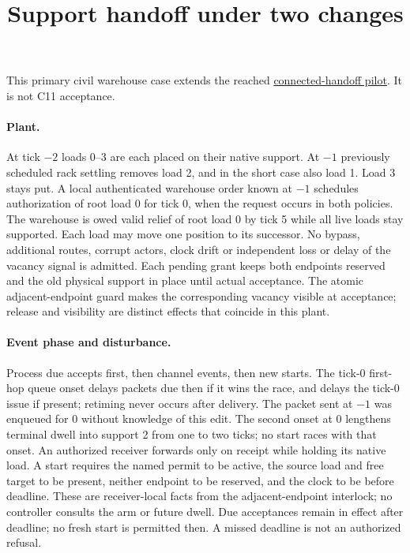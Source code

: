 \documentclass{article}
\title{Support handoff under two changes}
\date{}
\begin{document}
\maketitle
This primary civil warehouse case extends the reached \href{https://github.com/eternal-november/eos-research-programmes/pull/346}{connected-handoff pilot}. It is not C11 acceptance.

\paragraph{Plant.} At tick $-2$ loads 0--3 are each placed on their native support. At $-1$ previously scheduled rack settling removes load 2, and in the short case also load 1. Load 3 stays put. A local authenticated warehouse order known at $-1$ schedules authorization of root load 0 for tick 0, when the request occurs in both policies. The warehouse is owed valid relief of root load 0 by tick 5 while all live loads stay supported. Each load may move one position to its successor. No bypass, additional routes, corrupt actors, clock drift or independent loss or delay of the vacancy signal is admitted. Each pending grant keeps both endpoints reserved and the old physical support in place until actual acceptance. The atomic adjacent-endpoint guard makes the corresponding vacancy visible at acceptance; release and visibility are distinct effects that coincide in this plant.

\paragraph{Event phase and disturbance.} Process due accepts first, then channel events, then new starts. The tick-0 first-hop queue onset delays packets due then if it wins the race, and delays the tick-0 issue if present; retiming never occurs after delivery. The packet sent at $-1$ was enqueued for 0 without knowledge of this edit. The second onset at 0 lengthens terminal dwell into support 2 from one to two ticks; no start races with that onset. An authorized receiver forwards only on receipt while holding its native load. A start requires the named permit to be active, the source load and free target to be present, neither endpoint to be reserved, and the clock to be before deadline. These are receiver-local facts from the adjacent-endpoint interlock; no controller consults the arm or future dwell. Due acceptances remain in effect after deadline; no fresh start is permitted then. A missed deadline is not an authorized refusal.
\end{document}
